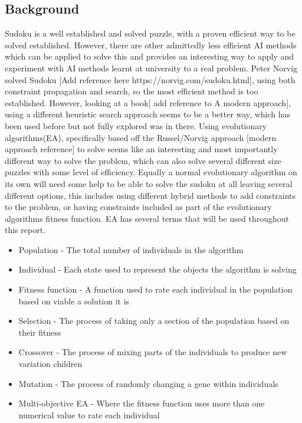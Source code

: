 \documentclass[a4paper,11pt]{article}
\begin{document}
\subsection{Background}
Sudoku is a well established and solved puzzle, with a proven efficient way to be solved established. However, there are other admittedly less efficient AI methods which can be applied to solve this and provides an interesting way to apply and experiment with AI methods learnt at university to a real problem.\newline \newline
Peter Norvig solved Sudoku [Add reference here https://norvig.com/sudoku.html], using both constraint propagation and search, so the most efficient method is too established. However, looking at a book[ add reference to A modern approach], using a different heuristic search approach seems to be a better way, which has been used before but not fully explored was in there. \newline \newline
Using evolutionary algorithms(EA), specifically based off the Russel/Norvig approach [modern approach reference] to solve seems like an interesting and most importantly different way to solve the problem, which can also solve several different size puzzles with some level of efficiency. Equally a normal evolutionary algorithm on its own will need some help to be able to solve the sudoku at all leaving several different options, this includes using different hybrid methods to add constraints to the problem, or having constraints included as part of the evolutionary algorithms fitness function.\newline\newline
EA has several terms that will be used throughout this report.\\
\begin{itemize}
	\item Population - The total number of individuals in the algorithm
	\item Individual - Each state used to represent the objects the algorithm is solving
	\item Fitness function - A function used to rate each individual in the population based on viable a solution it is
	\item Selection - The process of taking only a section of the population based on their fitness
	\item Crossover - The process of mixing parts of the individuals to produce new variation children 
	\item Mutation -  The process of randomly changing a gene within individuals
	\item Multi-objective EA - Where the fitness function uses more than one numerical value to rate each individual
\end{itemize}
\end{document}
